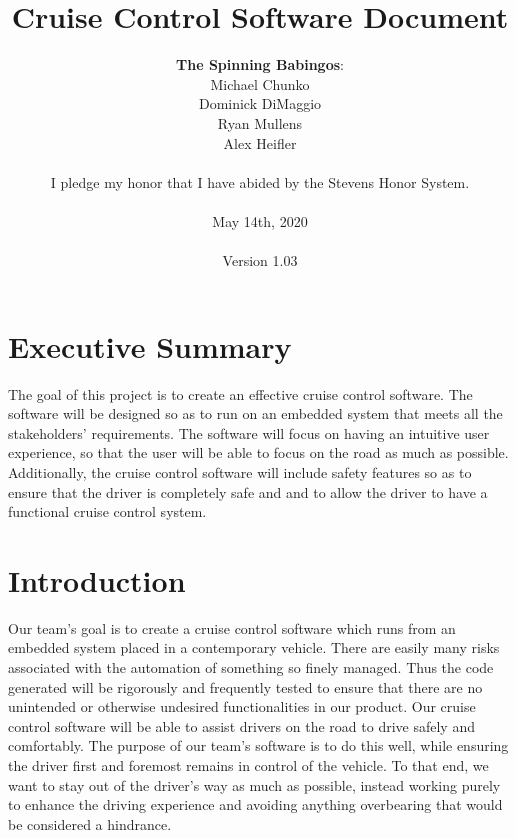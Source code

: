 \documentclass{article}
\title{\textbf{Cruise Control Software Document}}
\author{
	\textbf{The Spinning Babingos}: \\
	Michael Chunko \\
	Dominick DiMaggio \\
	Ryan Mullens \\
	Alex Heifler \\ \\
	I pledge my honor that I have abided by the Stevens Honor System. \\ \\
	May 14th, 2020 \\ \\
	Version 1.03
}
\date{}
\begin{document}
	
	\maketitle
	\newpage
	
	
	\pagestyle{plain}
	
	\tableofcontents
	
	\newpage
	
	\section{Executive Summary}
	\indent\indent The goal of this project is to create an effective cruise control software. The software will be designed so as to run on an embedded system that meets all the stakeholders’ requirements. The software will focus on having an intuitive user experience, so that the user will be able to focus on the road as much as possible. Additionally, the cruise control software will include safety features so as to ensure that the driver is completely safe and and to allow the driver to have a functional cruise control system. 	
	
	\section{Introduction}
	\indent\indent Our team's goal is to create a cruise control software which runs from an embedded system placed in a contemporary vehicle. There are easily many risks associated with the automation of something so finely managed. Thus the code generated will be rigorously and frequently tested to ensure that there are no unintended or otherwise undesired functionalities in our product. Our cruise control software will be able to assist drivers on the road to drive safely and comfortably. The purpose of our team’s software is to do this well, while ensuring the driver first and foremost remains in control of the vehicle. To that end, we want to stay out of the driver’s way as much as possible, instead working purely to enhance the driving experience and avoiding anything overbearing that would be considered a hindrance. \\
	
\end{document}
